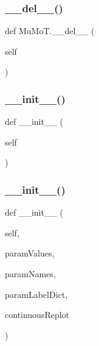 \subsubsection{\texorpdfstring{\+\_\+\+\_\+del\+\_\+\+\_\+()}{\_\_del\_\_()}}
{\footnotesize\ttfamily def Mu\+Mo\+T.\+\_\+\+\_\+del\+\_\+\+\_\+ (\begin{DoxyParamCaption}\item[{}]{self }\end{DoxyParamCaption})}

\mbox{\label{namespace_mu_mo_t_ae64f0875afe3067b97ba370b354b9213}} 
\subsubsection{\texorpdfstring{\+\_\+\+\_\+init\+\_\+\+\_\+()}{\_\_init\_\_()}\hspace{0.1cm}{\footnotesize\ttfamily [1/6]}}
{\footnotesize\ttfamily def \+\_\+\+\_\+init\+\_\+\+\_\+ (\begin{DoxyParamCaption}\item[{}]{self }\end{DoxyParamCaption})}

\mbox{\label{namespace_mu_mo_t_a73251532d0348adaeafe8a178cfc6a73}} 
\subsubsection{\texorpdfstring{\+\_\+\+\_\+init\+\_\+\+\_\+()}{\_\_init\_\_()}\hspace{0.1cm}{\footnotesize\ttfamily [2/6]}}
{\footnotesize\ttfamily def \+\_\+\+\_\+init\+\_\+\+\_\+ (\begin{DoxyParamCaption}\item[{}]{self,  }\item[{}]{param\+Values,  }\item[{}]{param\+Names,  }\item[{}]{param\+Label\+Dict,  }\item[{}]{continuous\+Replot }\end{DoxyParamCaption})}

